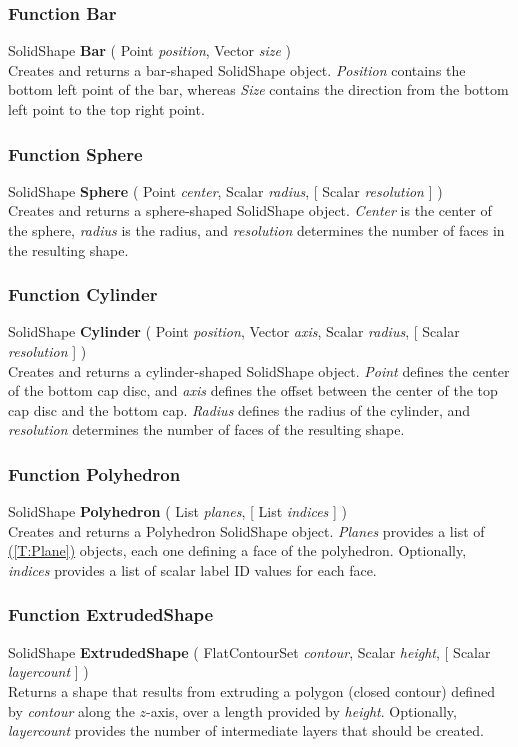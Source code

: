 \documentclass[10pt]{book}
\newcommand{\linkitem}[1]{\hyperref[#1]{\nameref{#1} (\ref{#1})}}
\newcommand{\var}[1]{\textit{#1}}
\begin{document}
\subsubsection{Function Bar \label{F:Bar}}
SolidShape \textbf{Bar} ( Point \textit{position}, Vector \textit{size} ) \\
Creates and returns a bar-shaped SolidShape object. \var{Position} contains the bottom left point of the bar, whereas \var{Size} contains the direction from the bottom left point to the top right point.

\subsubsection{Function Sphere \label{F:Sphere}}
SolidShape \textbf{Sphere} ( Point \textit{center}, Scalar \textit{radius},  [ Scalar \textit{resolution} ] ) \\
Creates and returns a sphere-shaped SolidShape object. \var{Center} is the center of the sphere, \var{radius} is the radius, and \var{resolution} determines the number of faces in the resulting shape.

\subsubsection{Function Cylinder \label{F:Cylinder}}
SolidShape \textbf{Cylinder} ( Point \textit{position}, Vector \textit{axis}, Scalar \textit{radius},  [ Scalar \textit{resolution} ] ) \\
Creates and returns a cylinder-shaped SolidShape object. \var{Point} defines the center of the bottom cap disc, and \var{axis} defines the offset between the center of the top cap disc and the bottom cap. \var{Radius} defines the radius of the cylinder, and \var{resolution} determines the number of faces of the resulting shape.

\subsubsection{Function Polyhedron \label{F:Polyhedron}}
SolidShape \textbf{Polyhedron} ( List \textit{planes},  [ List \textit{indices} ] ) \\
Creates and returns a Polyhedron SolidShape object. \var{Planes} provides a list of \linkitem{T:Plane} objects, each one defining a face of the polyhedron. Optionally, \var{indices} provides a list of scalar label ID values for each face.

\subsubsection{Function ExtrudedShape \label{F:ExtrudedShape}}
SolidShape \textbf{ExtrudedShape} ( FlatContourSet \textit{contour}, Scalar \textit{height},  [ Scalar \textit{layercount} ] ) \\
Returns a shape that results from extruding a polygon (closed contour) defined by \var{contour} along the $z$-axis, over a length provided by \var{height}. Optionally, \var{layercount} provides the number of intermediate layers that should be created.
\end{document}
